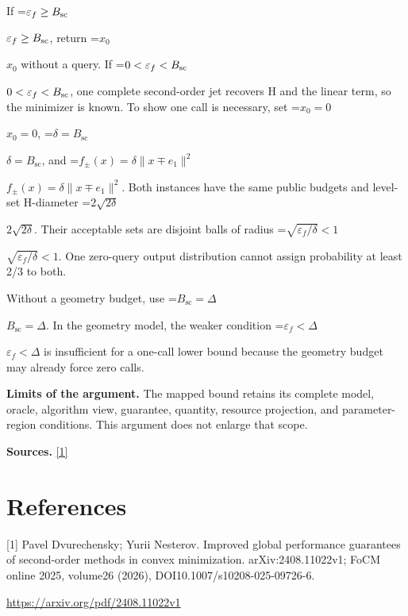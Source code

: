 \documentclass[10pt,a4paper]{article}
\newcommand{\AtlasMath}[1]{\par\begingroup\centering\setbox0=\hbox{$\displaystyle #1$}\ifdim\wd0>1.4\linewidth\typeout{ATLAS WIDE FORMULA: \the\wd0}\fi\ifdim\wd0>\linewidth\resizebox{\linewidth}{!}{\box0}\else\box0\fi\par\endgroup}
\newcommand{\AtlasInlineMath}[1]{\begingroup\setbox0=\hbox{$#1$}\ifdim\wd0>.4\linewidth\endgroup\AtlasMath{#1}\else\endgroup$#1$\fi}
\begin{document}
If \AtlasInlineMath{\varepsilon_f\ge B_{\rm sc}}, return \AtlasInlineMath{x_0} without a query. If \AtlasInlineMath{0<\varepsilon_f<B_{\rm sc}}, one complete second-order jet recovers H and the linear term, so the minimizer is known. To show one call is necessary, set \AtlasInlineMath{x_0=0}, \AtlasInlineMath{\delta=B_{\mathrm{sc}}}, and \AtlasInlineMath{f_\pm(x)=\delta\|x\mp e_1\|^2}. Both instances have the same public budgets and level-set H-diameter \AtlasInlineMath{2\sqrt{2\delta}}. Their acceptable sets are disjoint balls of radius \AtlasInlineMath{\sqrt{\varepsilon_f/\delta}<1}. One zero-query output distribution cannot assign probability at least 2/3 to both.

Without a geometry budget, use \AtlasInlineMath{B_{\mathrm{sc}}=\Delta}. In the geometry model, the weaker condition \AtlasInlineMath{\varepsilon_f<\Delta} is insufficient for a one-call lower bound because the geometry budget may already force zero calls.

\textbf{Limits of the argument.} The mapped bound retains its complete model, oracle, algorithm view, guarantee, quantity, resource projection, and parameter-region conditions. This argument does not enlarge that scope.

\textbf{Sources.} \href{https://arxiv.org/pdf/2408.11022v1}{[1]}

\section{References}
[1] Pavel Dvurechensky; Yurii Nesterov. Improved global performance guarantees of second-order methods in convex minimization. arXiv:2408.11022v1; FoCM online 2025, volume26 (2026), DOI10.1007/s10208-025-09726-6.

\url{https://arxiv.org/pdf/2408.11022v1}
\end{document}
